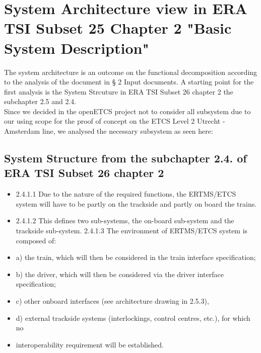 
\section{System Architecture view in ERA TSI Subset 25 Chapter 2 "Basic System Description"}
The system architecture is an outcome on the functional decomposition according to the analysis of the document in § 2 Input documents. A starting point for the first analysis is the System Strcuture in ERA TSI Subset 26 chapter 2 the subchapter 2.5 and 2.4.\\

Since we decided in the openETCS project not to consider all subsystem due to our using scope for the proof of concept on the ETCS Level 2 Utrecht - Amsterdam line, we analysed the necessary subsystem as seen here:\\

\subsection{System Structure from the subchapter 2.4. of ERA TSI Subset 26 chapter 2}

\begin{itemize}
\item 2.4.1.1	Due to the nature of the required functions, the ERTMS/ETCS system will have to be partly on the trackside and partly on board the trains. 
\item 2.4.1.2	This defines two sub-systems, the on-board sub-system and the trackside sub-system.
2.4.1.3	The environment of ERTMS/ETCS system is composed of:
\item a)	the train, which will then be considered in the train interface specification;
\item b)	the driver, which will then be considered via the driver interface specification;
\item c)	other onboard interfaces (see architecture drawing in 2.5.3),
\item d)	external trackside systems (interlockings, control centres, etc.), for which no 
\item interoperability requirement will be established.
\end{itemize}

